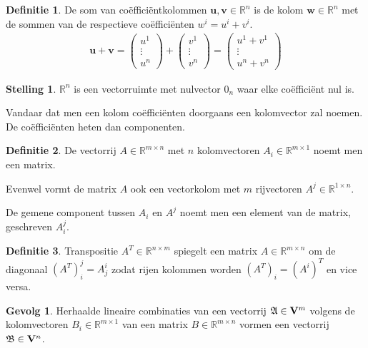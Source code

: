 \documentclass{amsart}
\theoremstyle{definition}
\newtheorem{thm}{Stelling}[section]
\newtheorem{dfn}{Definitie}[section]
\newtheorem{csq}{Gevolg}[section]
\newcommand{\realnums}{\mathbb{R}}
\newcommand{\realn}[1][n]{\realnums^{#1}}
\newcommand{\realmx}[2][n]{\realn[#2 \times #1]}
\newcommand{\realmxn}{\realmx{m}}
\newcommand{\vecspace}[1][v]{\mathrm{\mathbf{\MakeUppercase#1}}}
\newcommand{\vecspacen}[1][n]{\vecspace^#1}
\newcommand{\vvec}[1][v]{\mathbf{#1}}
\newcommand{\vecrow}[1][a]{\mathfrak{\MakeUppercase{#1}}}
\begin{document}
\begin{dfn}
    De som van coëfficiëntkolommen $\vvec[u], \vvec \in \realn$ is de kolom $\vvec[w] \in \realn$ met de sommen van de respectieve coëfficiënten ${w}^i = {u}^i + {v}^i$.
    \begin{align*}
        \vvec[u] + \vvec =
        \begin{pmatrix}
            u^1    \\
            \vdots \\
            u^n
        \end{pmatrix}
        +
        \begin{pmatrix}
            v^1    \\
            \vdots \\
            v^n
        \end{pmatrix}
        =
        \begin{pmatrix}
            u^1 + v^1 \\
            \vdots    \\
            u^n + v^n
        \end{pmatrix}
    \end{align*}
\end{dfn}

\begin{thm}
    $\realn$ is een vectorruimte met nulvector $0_n$ waar elke coëfficiënt nul is.
\end{thm}

Vandaar dat men een kolom coëfficiënten doorgaans een kolomvector zal noemen. De coëfficiënten heten dan componenten.

\begin{dfn}
    De vectorrij $A \in \realn[m \times n]$ met $n$ kolomvectoren $A_{i} \in \realn[m \times 1]$ noemt men een matrix.

    Evenwel vormt de matrix $A$ ook een vectorkolom met $m$ rijvectoren $A^j \in \realn[1 \times n]$.

    De gemene component tussen $A_i$ en $A^j$ noemt men een element van de matrix, geschreven $A_i^j$.
\end{dfn}

\begin{dfn}
    Transpositie $A^T \in \realmx[m]{n}$ spiegelt een matrix $A \in \realmxn$ om de diagonaal $(A^T)_i^j = A_j^i$ zodat rijen kolommen worden $(A^T)_i = (A^i)^T$ en vice versa.
\end{dfn}

\begin{csq}
    Herhaalde lineaire combinaties van een vectorrij $\vecrow \in \vecspacen[m]$ volgens de kolomvectoren $B_i \in \realn[m \times 1]$ van een matrix $B \in \realmxn$ vormen een vectorrij $\vecrow[b] \in \vecspacen$.
\end{csq}
\end{document}
